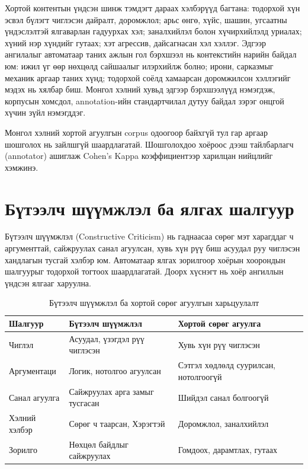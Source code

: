 Хортой контентын үндсэн шинж тэмдэгт дараах хэлбэрүүд багтана: тодорхой хүн
эсвэл бүлэгт чиглэсэн дайралт, доромжлол; арьс өнгө, хүйс, шашин, угсаатны
үндэслэлтэй ялгаварлан гадуурхах хэл; заналхийлэл болон хүчирхийлэлд уриалах;
хүний нэр хүндийг гутаах; хэт агрессив, дайсагнасан хэл хэллэг. Эдгээр
ангилалыг автоматаар таних ажлын гол бэрхшээл нь контекстийн нарийн байдал
юм: ижил үг өөр нөхцөлд сайшаалыг илэрхийлж болно; ирони, сарказмыг механик
аргаар таних хүнд; тодорхой соёлд хамаарсан доромжилсон хэллэгийг мэдэх нь
хялбар биш. Монгол хэлний хувьд эдгээр бэрхшээлүүд нэмэгдэж, корпусын
хомсдол, annotation-ийн стандартчилал дутуу байдал зэрэг онцгой хүчин зүйл
нэмэгддэг.

Монгол хэлний хортой агуулгын corpus одоогоор байхгүй тул гар аргаар шошголох
нь зайлшгүй шаардлагатай. Шошголохдоо хоёроос дээш тайлбарлагч (annotator)
ашиглаж Cohen's Kappa коэффициентээр харилцан нийцлийг хэмжинэ.

\section{Бүтээлч шүүмжлэл ба ялгах шалгуур}

Бүтээлч шүүмжлэл (Constructive Criticism) нь гаднаасаа сөрөг мэт харагддаг ч
аргументтай, сайжруулах санал агуулсан, хувь хүн рүү биш асуудал руу чиглэсэн
хандлагын тусгай хэлбэр юм. Автоматаар ялгах зорилгоор хоёрын хоорондын
шалгуурыг тодорхой тогтоох шаардлагатай. Доорх хүснэгт нь хоёр ангиллын
үндсэн ялгааг харуулна.

\begin{table}[ht]
  \centering
  \caption{Бүтээлч шүүмжлэл ба хортой сөрөг агуулгын харьцуулалт}
  \label{tab:constructive-vs-toxic}
  \begin{tabular}{lll}
    \toprule
    \textbf{Шалгуур} & \textbf{Бүтээлч шүүмжлэл} & \textbf{Хортой сөрөг агуулга} \\
    \midrule
    Чиглэл       & Асуудал, үзэгдэл рүү чиглэсэн & Хувь хүн рүү чиглэсэн \\
    Аргументаци  & Логик, нотолгоо агуулсан & Сэтгэл хөдлөлд суурилсан, нотолгоогүй \\
    Санал агуулга & Сайжруулах арга замыг тусгасан & Шийдэл санал болгоогүй \\
    Хэлний хэлбэр & Сөрөг ч таарсан, Хэрэгтэй & Доромжлол, заналхийлэл \\
    Зорилго       & Нөхцөл байдлыг сайжруулах & Гомдоох, дарамтлах, гутаах \\
    \bottomrule
  \end{tabular}
\end{table}

